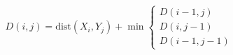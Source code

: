 \begin{equation}
    D(i, j) = \text{dist}(X_i, Y_j) + \min \begin{cases}
        D(i-1, j) \\
        D(i, j-1) \\
        D(i-1, j-1)
    \end{cases}
    \label{eq:dtw_recursive}
\end{equation}
